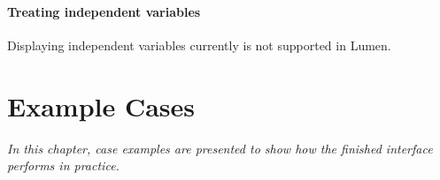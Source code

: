 \documentclass{article}
\begin{document}
\paragraph{Treating independent variables}
Displaying independent variables currently is not supported in Lumen.


\section{Example Cases}

\textit{In this chapter, case examples are presented to show how the finished interface performs in practice.}
\end{document}
